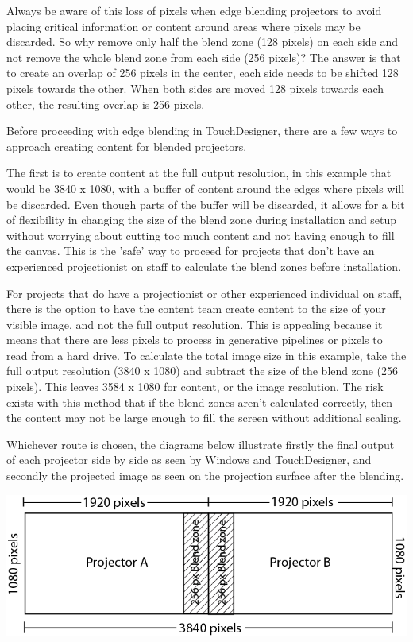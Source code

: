 \begin{fullwidth}
Always be aware of this loss of pixels when edge blending projectors to avoid placing critical information or content around areas where pixels may be discarded. So why remove only half the blend zone (128 pixels) on each side and not remove the whole blend zone from each side (256 pixels)? The answer is that to create an overlap of 256 pixels in the center, each side needs to be shifted 128 pixels towards the other. When both sides are moved 128 pixels towards each other, the resulting overlap is 256 pixels.

Before proceeding with edge blending in TouchDesigner, there are a few ways to approach creating content for blended projectors. 

The first is to create content at the full output resolution, in this example that would be 3840 x 1080, with a buffer of content around the edges where pixels will be discarded. Even though parts of the buffer will be discarded, it allows for a bit of flexibility in changing the size of the blend zone during installation and setup without worrying about cutting too much content and not having enough to fill the canvas. This is the 'safe' way to proceed for projects that don't have an experienced projectionist on staff to calculate the blend zones before installation.

For projects that do have a projectionist or other experienced individual on staff, there is the option to have the content team create content to the size of your visible image, and not the full output resolution. This is appealing because it means that there are less pixels to process in generative pipelines or pixels to read from a hard drive. To calculate the total image size in this example, take the full output resolution (3840 x 1080) and subtract the size of the blend zone (256 pixels). This leaves 3584 x 1080 for content, or the image resolution. The risk exists with this method that if the blend zones aren't calculated correctly, then the content may not be large enough to fill the screen without additional scaling.

Whichever route is chosen, the diagrams below illustrate firstly the final output of each projector side by side as seen by Windows and TouchDesigner, and secondly the projected image as seen on the projection surface after the blending.

\begin{center}
\includegraphics{./img/10.5/full_layout.png}
\end{center}


\end{fullwidth}
